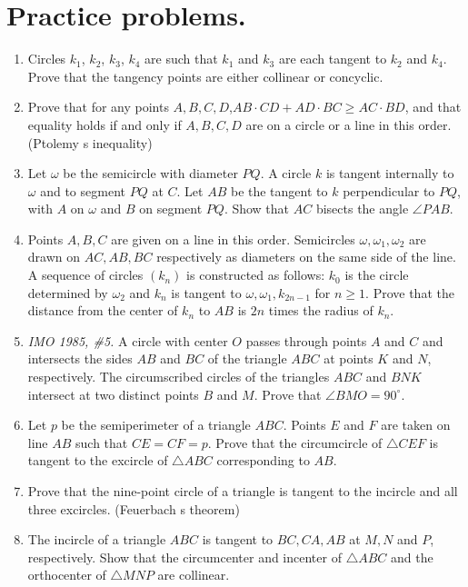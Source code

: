 \documentclass[11pt,a4paper]{article}
\begin{document}
\section {Practice problems.}
\begin{enumerate}
\item Circles $k_1$, $k_2$, $k_3$, $k_4$ are such that $k_1$ and $k_3$ are each tangent to $k_2$ and $k_4$. Prove that the tangency points are either collinear or concyclic.

\item Prove that for any points $A, B,C, D$,$AB\cdot CD+AD\cdot BC\ge AC\cdot BD$, and that equality holds if and only if $A,B,C,D$ are on a circle or a line in this order. (Ptolemy s inequality)

\item Let $\omega$ be the semicircle with diameter $PQ$. A circle $k$ is tangent internally to $\omega$ and to segment $PQ$ at $C$. Let $AB$ be the tangent to $k$ perpendicular to $PQ$, with $A$ on $\omega$  and $B$ on segment $PQ$. Show that $AC$ bisects the angle $\angle PAB$. 

\item Points $A,B,C$ are given on a line in this order. Semicircles $\omega, \omega_1, \omega_2$ are drawn on  $AC,AB,BC$  respectively as diameters on the same side of the line. A sequence of circles $(k_n)$ is constructed as follows: $k_0$ is the circle determined by $\omega_2$ and $k_n$ is tangent to $\omega,\omega_1,k_{2n-1}$  for $n\ge 1$. Prove that the distance from the center of $k_n$ to $AB$  is $2n$ times the radius of $k_n$.

\item\emph{IMO 1985, \#5.} A circle with center $O$ passes through points $A$ and $C$ and intersects the sides $AB$ and $BC$ of the triangle $ABC$ at points $K$ and $N$, respectively. The circumscribed circles of the triangles $ABC$ and $BNK$ intersect at two distinct points $B$ and $M$. Prove that $\angle BMO=90^{\circ}$.

\item Let $p$ be the semiperimeter of a triangle $ABC$. Points $E$ and $F$ are taken on line $AB$ such that $CE=CF=p$. Prove that the circumcircle of $\triangle CEF$ is tangent to the excircle of $\triangle ABC$ corresponding to $AB$. 

\item Prove that the nine-point circle of a triangle is tangent to the incircle and all three excircles. (Feuerbach s theorem) 

\item The incircle of a triangle $ABC$ is tangent to $BC, CA, AB$ at $M,N$ and $P$, respectively. Show that the circumcenter and incenter of $\triangle ABC$ and the orthocenter of $\triangle MNP$ are collinear. 


\end{enumerate}
\end{document}
